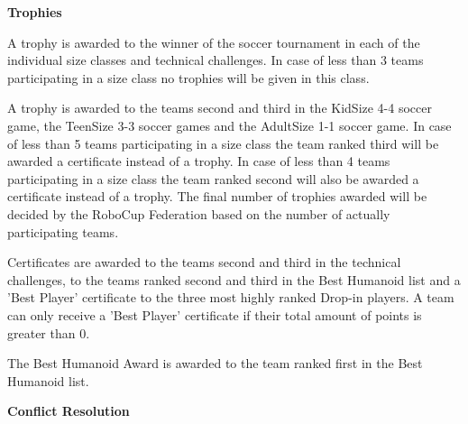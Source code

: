 \bigskip

{\bfseries Trophies}

\headlinebox

A trophy is awarded to the winner of the soccer tournament in each of the individual size classes and technical challenges. In case of less than 3 teams participating in a size class no trophies will be given in this class.

\bigskip

A trophy is awarded to the teams second and third in the KidSize 4-4 soccer game, the TeenSize 3-3 soccer games and the AdultSize 1-1 soccer game. In case of less than 5 teams participating in a size class the team ranked third will be awarded a certificate instead of a trophy. In case of less than 4 teams participating in a size class the team ranked second will also be awarded a certificate instead of a trophy. The final number of trophies awarded will be decided by the RoboCup Federation based on the number of actually participating teams.

\bigskip

Certificates are awarded to the teams second and third in the technical challenges, to the teams ranked second and third in the Best Humanoid list and a 'Best Player' certificate to the three most highly ranked Drop-in players. A team can only receive a 'Best Player' certificate if their total amount of points is greater than 0.

\bigskip

The Best Humanoid Award is awarded to the team ranked first in the Best Humanoid list.

\bigskip

{\bfseries Conflict Resolution}

\headlinebox


\bigskip

